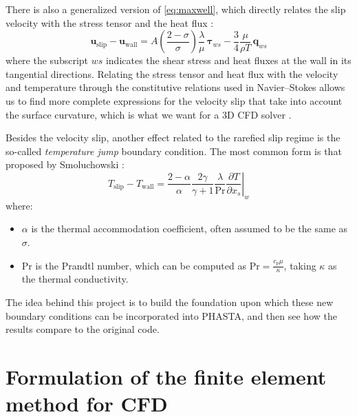 \documentclass{ucb}
\begin{document}
There is also a generalized version of \autoref{eq:maxwell}, which directly relates the slip velocity with the stress tensor and the heat flux \cite{lockerbyVelocity}:
\begin{equation}
    \bm{u}_\mathrm{slip} - \bm{u}_\mathrm{wall} = A\left(\frac{2-\sigma}{\sigma}\right)\frac{\lambda}{\mu}\,\bm{\tau}_{ws} - \frac{3}{4}\frac{\mu}{\rho T}\,\bm{q}_{ws}
    \label{eq:generalized}
\end{equation}
where the subscript $ws$ indicates the shear stress and heat fluxes at the wall in its tangential directions. Relating the stress tensor and heat flux with the velocity and temperature through the constitutive relations used in Navier--Stokes allows us to find more complete expressions for the velocity slip that take into account the surface curvature, which is what we want for a 3D CFD solver \cite{evaluation, newSmoluchowski}.

Besides the velocity slip, another effect related to the rarefied slip regime is the so-called \textit{temperature jump} boundary condition. The most common form is that proposed by Smoluchowski \cite{evaluation, fluidMicrodevices}:
\begin{equation}
    T_\mathrm{slip} - T_\mathrm{wall} = \frac{2-\alpha}{\alpha}\frac{2\gamma}{\gamma+1}\frac{\lambda}{\mathrm{Pr}}\left.\frac{\partial T}{\partial x_s}\right|_w
    \label{eq:smoluchowski}
\end{equation}
where:
\begin{itemize}
    \item $\alpha$ is the thermal accommodation coefficient, often assumed to be the same as $\sigma$.
    \item $\mathrm{Pr}$ is the Prandtl number, which can be computed as $\mathrm{Pr} = \frac{c_p\mu}{\kappa}$, taking $\kappa$ as the thermal conductivity.
\end{itemize}

The idea behind this project is to build the foundation upon which these new boundary conditions can be incorporated into PHASTA, and then see how the results compare to the original code.

\pagebreak

\section{Formulation of the finite element method for CFD}
\label{sec:formulation}
\end{document}
